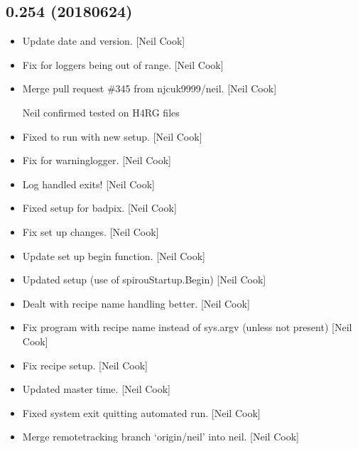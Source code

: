 \documentclass[a4paper,10pt,english]{report}
\begin{document}
\subsection{0.254 (2018\sphinxhyphen{}06\sphinxhyphen{}24)}
\label{\detokenize{misc/changelog:id430}}\begin{itemize}
\item {} 
Update date and version. {[}Neil Cook{]}

\item {} 
Fix for loggers being out of range. {[}Neil Cook{]}

\item {} 
Merge pull request \#345 from njcuk9999/neil. {[}Neil Cook{]}

Neil \sphinxhyphen{} confirmed tested on H4RG files

\item {} 
Fixed to run with new setup. {[}Neil Cook{]}

\item {} 
Fix for warninglogger. {[}Neil Cook{]}

\item {} 
Log handled exits! {[}Neil Cook{]}

\item {} 
Fixed setup for badpix. {[}Neil Cook{]}

\item {} 
Fix set up changes. {[}Neil Cook{]}

\item {} 
Update set up begin function. {[}Neil Cook{]}

\item {} 
Updated setup (use of spirouStartup.Begin) {[}Neil Cook{]}

\item {} 
Dealt with recipe name handling better. {[}Neil Cook{]}

\item {} 
Fix program with recipe name instead of sys.argv (unless not present)
{[}Neil Cook{]}

\item {} 
Fix recipe setup. {[}Neil Cook{]}

\item {} 
Updated master time. {[}Neil Cook{]}

\item {} 
Fixed system exit quitting automated run. {[}Neil Cook{]}

\item {} 
Merge remote\sphinxhyphen{}tracking branch ‘origin/neil’ into neil. {[}Neil Cook{]}


\end{itemize}
\end{document}

